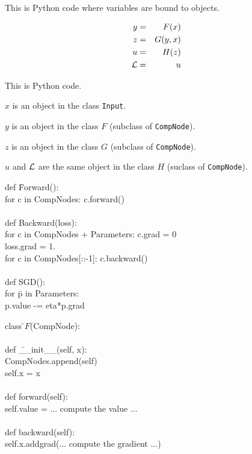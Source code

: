 {\vfill
This is Python code where variables are bound to objects.


\begin{eqnarray*}
  y & = & F(x) \\
  z & = & G(y,x) \\
  u & = & H(z) \\
  {\cal L} &  = &  u
\end{eqnarray*}

\vfill
This is Python code.

\vfill
$x$ is an object in the class {\tt Input}.

\vfill
$y$ is an object in the class $F$ (subclass of {\tt CompNode}).

\vfill
$z$ is an object in the class $G$ (subclass of {\tt CompNode}).

\medskip
$u$ and ${\cal L}$ are the same object in the class $H$ (suclass of {\tt CompNode}).


\begin{tabbing}
def \=Forward(): \\
   \>for c in CompNodes: c.forward() \\
\\
def \>Backward(loss): \\
    \> for c in CompNodes + Parameters: c.grad = 0 \\
    \> loss.grad = 1. \\
    \> for c in CompNodes[::-1]: c.backward() \\
    \\
def \> SGD(): \\
    \> for \= p in Parameters: \\
       \>\>p.value -= eta*p.grad
\end{tabbing}


\begin{tabbing}
  class \=$F$(CompNode): \\
  \\
    \>def \=\_\_init\_\_(self, x): \\
        \>\>CompNodes.append(self) \\
        \>\>self.x = x \\
\\
    \>def forward(self): \\
        \>\>self.value = ... compute the value ... \\
\\
    \>def backward(self): \\
        \>\>self.x.addgrad(... compute the gradient ...)
\end{tabbing}

}
